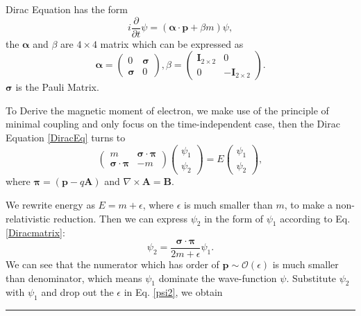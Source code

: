 \documentclass[12pt,twoside]{report}
\numberwithin{problemname}{chapter}
\newenvironment{solution}{\vspace{1em}\par\noindent{\large\textbf{\textsc{Solution}}}\par}{\vspace{1em}\hrule}
\begin{document}
\begin{solution}
Dirac Equation has the form
\begin{equation}
    i\frac{\partial}{\partial t}\psi=(\mathbf{\alpha}\cdot\mathbf{p}+\beta m)\psi,\label{DiracEq}
\end{equation}
the $\mathbf{\alpha}$ and $\beta$ are $4\times4$ matrix which can be expressed as
\begin{equation}
    \mathbf{\alpha}=
    \begin{pmatrix}
        0 & \mathbf{\sigma} \\
        \mathbf{\sigma} & 0
    \end{pmatrix},
    \beta=
    \begin{pmatrix}
        \mathbf{I}_{2\times2} & 0 \\
        0 & -\mathbf{I}_{2\times2}
    \end{pmatrix}.
\end{equation}
$\mathbf{\sigma}$ is the Pauli Matrix.
\par
To Derive the magnetic moment of electron, we make use of the principle of minimal coupling and only focus on the time-independent case, then the Dirac Equation \eqref{DiracEq} turns to
\begin{equation}
    \begin{pmatrix}
        m & \bm{\sigma}\cdot\bm{\pi} \\
        \bm{\sigma}\cdot\bm{\pi} & -m
    \end{pmatrix}
    \begin{pmatrix}
        \psi_1 \\
        \psi_2
    \end{pmatrix}
    =E
    \begin{pmatrix}
        \psi_1 \\
        \psi_2
    \end{pmatrix},\label{Diracmatrix}
\end{equation}
where $\bm{\pi}=(\mathbf{p}-q\mathbf{A})$ and $\nabla\times\mathbf{A}=\mathbf{B}$.
\par
We rewrite energy as $E=m+\epsilon$, where $\epsilon$ is much smaller than $m$, to make a non-relativistic reduction. Then we can express $\psi_2$ in the form of $\psi_1$ according to Eq. \eqref{Diracmatrix}:
\begin{equation}
    \psi_2=\frac{\bm{\sigma}\cdot\bm{\pi}}{2m+\epsilon}\psi_1.\label{psi2}
\end{equation}
We can see that the numerator which has order of $\mathbf{p}\sim\mathcal{O}(\epsilon)$ is much smaller than denominator, which means $\psi_1$ dominate the wave-function $\psi$. Substitute $\psi_2$ with $\psi_1$ and drop out the $\epsilon$ in Eq. \eqref{psi2}, we obtain

\end{solution}
\end{document}
